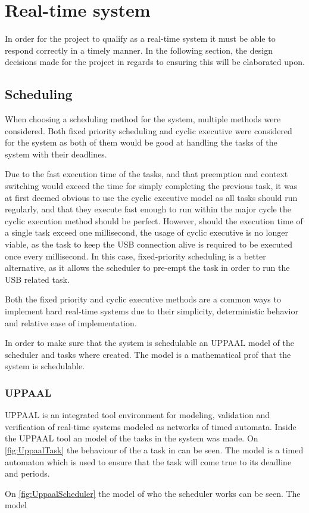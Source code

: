 \section{Real-time system}\label{Design:RTS} 
In order for the project to qualify as a real-time system it must be able to respond correctly in a timely manner.
In the following section, the design decisions made for the project in regards to ensuring this will be elaborated upon. 

\subsection{Scheduling}\label{Design:Scheduling}
When choosing a scheduling method for the system, multiple methods were considered. 
Both fixed priority scheduling and cyclic executive were considered for the system as both of them would be good at handling the tasks of the system with their deadlines.

Due to the fast execution time of the tasks, and that preemption and context switching would exceed the time for simply completing the previous task, it was at first deemed obvious to use the cyclic executive model as all tasks should run regularly, and that they execute fast enough to run within the major cycle the cyclic execution method should be perfect. 
However, should the execution time of a single task exceed one millisecond, the usage of cyclic executive is no longer viable, as the task to keep the USB connection alive is required to be executed once every millisecond.
In this case, fixed-priority scheduling is a better alternative, as it allows the scheduler to pre-empt the task in order to run the USB related task.

Both the fixed priority and cyclic executive methods are a common ways to implement hard real-time systems due to their simplicity, deterministic behavior and relative ease of implementation\cite{CyclicExecutionKimLarsen}.

In order to make sure that the system is schedulable an UPPAAL model of the scheduler and tasks where created. 
The model is a mathematical prof that the system is schedulable. 

\subsubsection{UPPAAL}
UPPAAL is an integrated tool environment for modeling, validation and verification of real-time systems modeled as networks of timed automata\cite{UPPAALWebsite}. 
Inside the UPPAAL tool an model of the tasks in the system was made. 
On \autoref{fig:UppaalTask} the behaviour of the a task in can be seen. 
The model is a timed automaton which is used to ensure that the task will come true to its deadline and periods. 

On \autoref{fig:UppaalScheduler} the model of who the scheduler works can be seen. 
The model 
